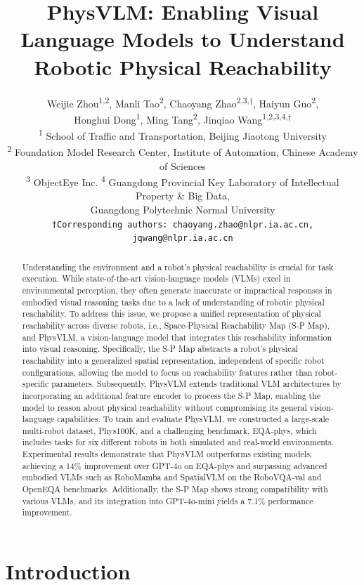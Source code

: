 \documentclass[10pt,twocolumn,letterpaper]{article}
\title{PhysVLM: Enabling Visual Language Models to Understand Robotic Physical Reachability}
\author{
Weijie Zhou\textsuperscript{1,2}, Manli Tao\textsuperscript{2}, Chaoyang Zhao\textsuperscript{2,3,†}, Haiyun Guo\textsuperscript{2}, \\
Honghui Dong\textsuperscript{1}, Ming Tang\textsuperscript{2}, Jinqiao Wang\textsuperscript{1,2,3,4,†} \\
\textsuperscript{1} School of Traffic and Transportation, Beijing Jiaotong University \\ 
\textsuperscript{2} Foundation Model Research Center, Institute of Automation, Chinese Academy of Sciences \\
\textsuperscript{3} ObjectEye Inc. \quad
\textsuperscript{4} Guangdong Provincial Key Laboratory of Intellectual Property \& Big Data, \\
\hspace*{1.2em}Guangdong Polytechnic Normal University \\
{\tt\small †Corresponding authors: chaoyang.zhao@nlpr.ia.ac.cn, jqwang@nlpr.ia.ac.cn}
}
\begin{document}
\maketitle


\begin{abstract}
Understanding the environment and a robot's physical reachability is crucial for task execution. While state-of-the-art vision-language models (VLMs) excel in environmental perception, they often generate inaccurate or impractical responses in embodied visual reasoning tasks due to a lack of understanding of robotic physical reachability. To address this issue, we propose a unified representation of physical reachability across diverse robots, i.e., Space-Physical Reachability Map (S-P Map), and PhysVLM, a vision-language model that integrates this reachability information into visual reasoning. Specifically, the S-P Map abstracts a robot's physical reachability into a generalized spatial representation, independent of specific robot configurations, allowing the model to focus on reachability features rather than robot-specific parameters. Subsequently, PhysVLM extends traditional VLM architectures by incorporating an additional feature encoder to process the S-P Map, enabling the model to reason about physical reachability without compromising its general vision-language capabilities. To train and evaluate PhysVLM, we constructed a large-scale multi-robot dataset, Phys100K, and a challenging benchmark, EQA-phys, which includes tasks for six different robots in both simulated and real-world environments. Experimental results demonstrate that PhysVLM outperforms existing models, achieving a 14\% improvement over GPT-4o on EQA-phys and surpassing advanced embodied VLMs such as RoboMamba and SpatialVLM on the RoboVQA-val and OpenEQA benchmarks. Additionally, the S-P Map shows strong compatibility with various VLMs, and its integration into GPT-4o-mini yields a 7.1\% performance improvement.

\end{abstract}


\section{Introduction}
\label{sec:intro}
\end{document}
